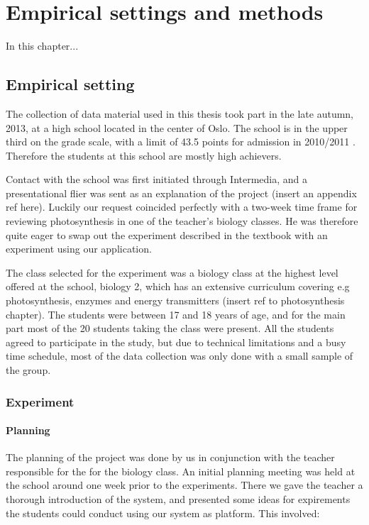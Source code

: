 \chapter{Empirical settings and methods}
In this chapter...

\section{Empirical setting}
The collection of data material used in this thesis took part in the late autumn, 2013, at a high school located in the center of Oslo. The school is in the upper third on the grade scale, with a limit of 43.5 points for admission in 2010/2011 \citep{utdanningsetaten}. Therefore the students at this school are mostly high achievers. 

Contact with the school was first initiated through Intermedia, and a presentational flier was sent as an explanation of the project (insert an appendix ref here). Luckily our request coincided perfectly with a two-week time frame for reviewing photosynthesis in one of the teacher's biology classes. He was therefore quite eager to swap out the experiment described in the textbook with an experiment using our application. 

The class selected for the experiment was a biology class at the highest level offered at the school, biology 2, which has an extensive curriculum covering e.g photosynthesis, enzymes and energy transmitters (insert ref to photosynthesis chapter). The students were between 17 and 18 years of age, and for the main part most of the 20 students taking the class were present. All the students agreed to participate in the study, but due to technical limitations and a busy time schedule, most of the data collection was only done with a small sample of the group. 

\subsection{Experiment}
\subsubsection{Planning}
The planning of the project was done by us in conjunction with the teacher responsible for the for the biology class. An initial planning meeting was held at the school around one week prior to the experiments. There we gave the teacher a thorough introduction of the system, and presented some ideas for expirements the students could conduct using our system as platform. This involved:


